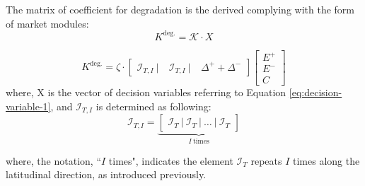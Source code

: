 The matrix of coefficient for degradation is the derived complying with the form of market modules:
\begin{equation}
K^{\text{deg.}}  = \mathcal{K} \cdot X
\end{equation}

\begin{equation}
K^{\text{deg.}} = \zeta \cdot \begin{bmatrix}
\mathcal{I}_{T,I} ~|~&\mathcal{I}_{T,I} ~|~& \Delta^{+} +\Delta^{-}
\end{bmatrix} \begin{bmatrix}
E^+ \\ E^- \\ C
\end{bmatrix}
\end{equation}
where, X is the vector of decision variables referring to Equation \eqref{eq:decision-variable-1}, and $\mathcal{I}_{T,I}$ is determined as following:
\begin{equation}
\label{eq:I_I}
\mathcal{I}_{T,I}  = %
\underbrace{\begin{bmatrix}
	\mathcal{I}_T~|~\mathcal{I}_T~|~ \dots~|~\mathcal{I}_T 
	\end{bmatrix}}_{I~\text{times}}
\end{equation}


where, the notation, ``$I$ times", indicates the element $\mathcal{I}_T$ repeats $I$ times along the latitudinal direction, as introduced previously.

